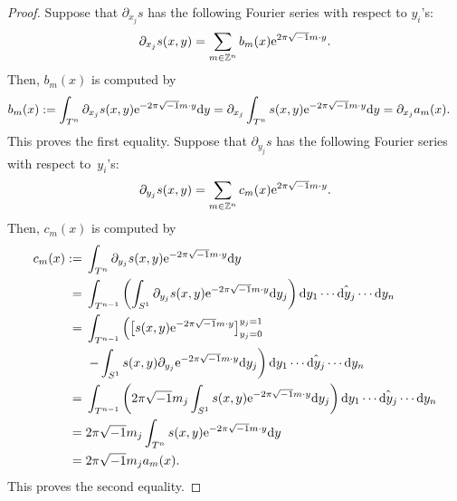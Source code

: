 \documentclass[pdftex]{sigma}
\numberwithin{equation}{section}
\newcommand{\Z}{\mathbb{Z}}
\begin{document}
\begin{proof}
Suppose that $\partial_{x_j}s$ has the following Fourier series with respect to $y_i$'s:
\begin{equation*}
\partial_{x_j}s(x,y)=\sum_{m\in \Z^n}b_m(x){\rm e}^{2\pi\sqrt{-1}m\cdot y}.
\end{equation*}
Then, $b_m(x)$ is computed by
\begin{align*}
b_m(x)&:=\int_{T^n}\partial_{x_j}s(x,y){\rm e}^{-2\pi\sqrt{-1}m\cdot y}{\rm d}y =\partial_{x_j}\int_{T^n}s(x,y){\rm e}^{-2\pi\sqrt{-1}m\cdot y}{\rm d}y=\partial_{x_j}a_m(x).
\end{align*}
This proves the first equality. Suppose that $\partial_{y_j}s$ has the following Fourier series with respect to~$y_i$'s:
\begin{equation*}
\partial_{y_j}s(x,y)=\sum_{m\in \Z^n}c_m(x){\rm e}^{2\pi\sqrt{-1}m\cdot y}.
\end{equation*}
Then, $c_m(x)$ is computed by
\begin{align*}
c_m(x):={}&\int_{T^n}\partial_{y_j}s(x,y){\rm e}^{-2\pi\sqrt{-1}m\cdot y}{\rm d}y\\
={}&\int_{T^{n-1}}
 \left(\int_{S^1}\partial_{y_j}s(x,y){\rm e}^{-2\pi\sqrt{-1}m\cdot y}{\rm d}y_j\right)
{\rm d}y_1\cdots \hat{{\rm d}y_j}\cdots {\rm d}y_n \\
={}& \int_{T^{n-1}} \left(\big[s(x,y){\rm e}^{-2\pi\sqrt{-1}m\cdot y}\big]_{y_j=0}^{y_j=1}\right.\\
&\left.- \int_{S^1}s(x,y)\partial_{y_j}{\rm e}^{-2\pi\sqrt{-1}m\cdot y}{\rm d}y_j\right){\rm d}y_1\cdots \hat{{\rm d}y_j}\cdots {\rm d}y_n \\
={}&\int_{T^{n-1}} \left(2\pi\sqrt{-1}m_j\int_{S^1}s(x,y){\rm e}^{-2\pi\sqrt{-1}m\cdot y}{\rm d}y_j\right){\rm d}y_1\cdots \hat{{\rm d}y_j}\cdots {\rm d}y_n \\
={}&2\pi\sqrt{-1}m_j\int_{T^n}s(x,y){\rm e}^{-2\pi\sqrt{-1}m\cdot y}{\rm d}y \\
={}& 2\pi\sqrt{-1}m_ja_m(x).
\end{align*}
This proves the second equality.
\end{proof}
\end{document}
